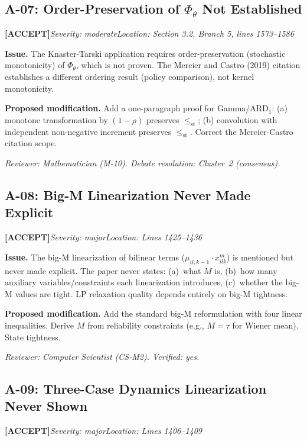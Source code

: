 \documentclass[11pt,a4paper]{article}
\newcommand{\acceptlabel}{\textbf{\textcolor{acceptgreen}{[ACCEPT]}}}
\begin{document}
\bigskip

\subsection{A-07: Order-Preservation of $\Phi_\theta$ Not Established}
\acceptlabel\quad\textit{Severity: moderate}\quad\textit{Location: Section 3.2, Branch 5, lines 1573--1586}

\textbf{Issue.} The Knaster-Tarski application requires order-preservation (stochastic monotonicity) of $\Phi_\theta$, which is not proven. The Mercier and Castro (2019) citation establishes a different ordering result (policy comparison), not kernel monotonicity.

\textbf{Proposed modification.} Add a one-paragraph proof for Gamma/ARD$_1$: (a) monotone transformation by $(1-\rho)$ preserves $\le_{\mathrm{st}}$; (b) convolution with independent non-negative increment preserves $\le_{\mathrm{st}}$. Correct the Mercier-Castro citation scope.

\textit{Reviewer: Mathematician (M-10). Debate resolution: Cluster~2 (consensus).}

\bigskip

\subsection{A-08: Big-M Linearization Never Made Explicit}
\acceptlabel\quad\textit{Severity: major}\quad\textit{Location: Lines 1425--1436}

\textbf{Issue.} The big-M linearization of bilinear terms ($\mu_{il,k-1}\cdot x^m_{ilk}$) is mentioned but never made explicit. The paper never states: (a)~what $M$ is, (b)~how many auxiliary variables/constraints each linearization introduces, (c)~whether the big-M values are tight. LP relaxation quality depends entirely on big-M tightness.

\textbf{Proposed modification.} Add the standard big-M reformulation with four linear inequalities. Derive $M$ from reliability constraints (e.g., $M=\tau$ for Wiener mean). State tightness.

\textit{Reviewer: Computer Scientist (CS-M2). Verified: yes.}

\bigskip

\subsection{A-09: Three-Case Dynamics Linearization Never Shown}
\acceptlabel\quad\textit{Severity: major}\quad\textit{Location: Lines 1406--1409}
\end{document}
